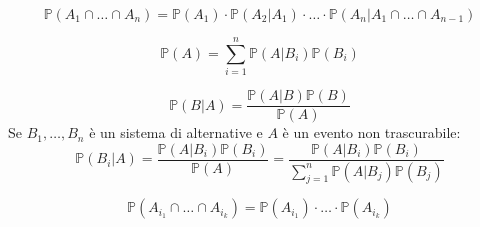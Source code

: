 \begin{proposition}
	\begin{equation}
		\mathbb{P}(A_1 \cap \ldots \cap A_n) = \mathbb{P}(A_1) \cdot \mathbb{P}(A_2 \vert A_1) \cdot \ldots \cdot \mathbb{P}(A_n \vert A_1 \cap \ldots \cap A_{n-1})
	\end{equation}
\end{proposition}

\begin{definition}
	\begin{equation}
		\mathbb{P}(A) = \sum_{i=1}^{n} \mathbb{P}(A \vert B_i)\mathbb{P}(B_i)
	\end{equation}
\end{definition}
\begin{definition}
	\begin{equation}
		\mathbb{P}(B \vert A) = \frac{\mathbb{P}(A \vert B)\mathbb{P}(B)}{\mathbb{P}(A)}
	\end{equation}
	Se $B_1, \ldots, B_n$ è un sistema di alternative e $A$ è un evento non trascurabile:
	\begin{equation}
		\mathbb{P}(B_i \vert A) = \frac{\mathbb{P}(A \vert B_i)\mathbb{P}(B_i)}{\mathbb{P}(A)} = \frac{\mathbb{P}(A \vert B_i) \mathbb{P}(B_i)}{\sum_{j=1}^{n}\mathbb{P}(A \vert B_j)\mathbb{P}(B_j)}
	\end{equation}
\end{definition}

\begin{definition}
	\begin{equation}
		\mathbb{P}(A_{i_1} \cap \ldots \cap A_{i_k}) = \mathbb{P}(A_{i_1}) \cdot \ldots \cdot \mathbb{P}(A_{i_k})
	\end{equation}
\end{definition}

